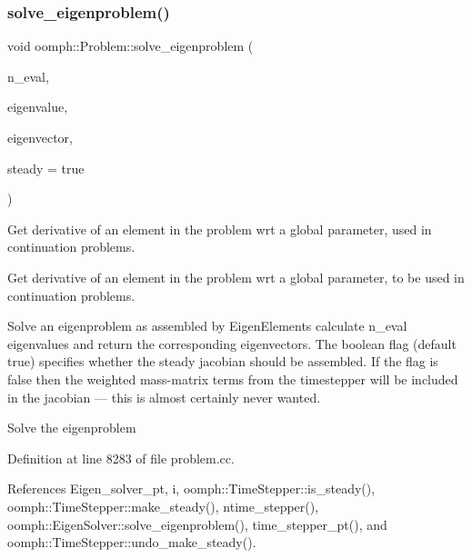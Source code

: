 \mbox{\label{classoomph_1_1Problem_afd4ce8fa26732998a40352542d0cecef}} 
\subsubsection{\texorpdfstring{solve\+\_\+eigenproblem()}{solve\_eigenproblem()}\hspace{0.1cm}{\footnotesize\ttfamily [1/2]}}
{\footnotesize\ttfamily void oomph\+::\+Problem\+::solve\+\_\+eigenproblem (\begin{DoxyParamCaption}\item[{const unsigned \&}]{n\+\_\+eval,  }\item[{\hyperlink{classoomph_1_1Vector}{Vector}$<$ std\+::complex$<$ double $>$ $>$ \&}]{eigenvalue,  }\item[{\hyperlink{classoomph_1_1Vector}{Vector}$<$ \hyperlink{classoomph_1_1DoubleVector}{Double\+Vector} $>$ \&}]{eigenvector,  }\item[{const bool \&}]{steady = {\ttfamily true} }\end{DoxyParamCaption})}



Get derivative of an element in the problem wrt a global parameter, used in continuation problems. 

Get derivative of an element in the problem wrt a global parameter, to be used in continuation problems.

Solve an eigenproblem as assembled by Eigen\+Elements calculate n\+\_\+eval eigenvalues and return the corresponding eigenvectors. The boolean flag (default true) specifies whether the steady jacobian should be assembled. If the flag is false then the weighted mass-\/matrix terms from the timestepper will be included in the jacobian --- this is almost certainly never wanted.

Solve the eigenproblem 

Definition at line 8283 of file problem.\+cc.



References Eigen\+\_\+solver\+\_\+pt, i, oomph\+::\+Time\+Stepper\+::is\+\_\+steady(), oomph\+::\+Time\+Stepper\+::make\+\_\+steady(), ntime\+\_\+stepper(), oomph\+::\+Eigen\+Solver\+::solve\+\_\+eigenproblem(), time\+\_\+stepper\+\_\+pt(), and oomph\+::\+Time\+Stepper\+::undo\+\_\+make\+\_\+steady().



